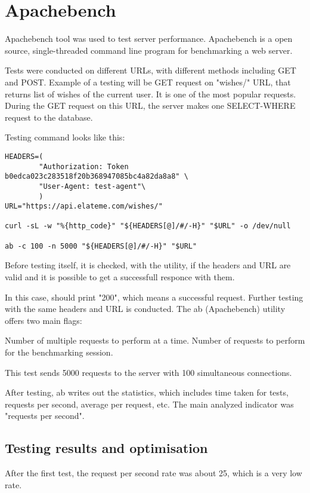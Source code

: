 \section{Apachebench}
Apachebench tool was used to test server performance. Apachebench is a open source, single-threaded command line program
for benchmarking a web server.

Tests were conducted on different \ac{URL}s, with different methods including GET and POST. Example of a testing will be
GET request on "wishes/" \ac{URL}, that returns list of wishes of the current user. It is one of the most popular
requests. During the GET request on this \ac{URL}, the server makes one SELECT-WHERE request to the database.

Testing command looks like this:

\begin{lstlisting}
HEADERS=(
        "Authorization: Token b0edca023c283518f20b368947085bc4a82da8a8" \
        "User-Agent: test-agent"\
        )
URL="https://api.elateme.com/wishes/"

curl -sL -w "%{http_code}" "${HEADERS[@]/#/-H}" "$URL" -o /dev/null

ab -c 100 -n 5000 "${HEADERS[@]/#/-H}" "$URL"
\end{lstlisting}
Before testing itself, it is checked, with the  utility, if the headers and \ac{URL} are valid and it is
possible to get a successfull responce with them.

In this case,  should print "200", which means a successful request. Further testing with the same headers
and \ac{URL} is conducted. The ab (Apachebench) utility offers two main flags:

\begin{itemize}
 Number of multiple requests to perform at a time.
\flag{n} Number of requests to perform for the benchmarking session.
\end{itemize}

This test sends 5000 requests to the server with 100 simultaneous connections.

After testing, ab writes out the statistics, which includes time taken for tests, requests per second, average per
request, etc. The main analyzed indicator was "requests per second".

\subsection{Testing results and optimisation}
After the first test, the request per second rate was about 25, which is a very low rate.

